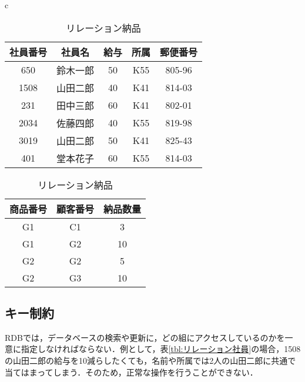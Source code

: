 \documentclass[a4paper,10pt]{jreport}
\begin{document}
\begin{table}[htp]
	\begin{center}
		\begin{tabular}{c}
			\begin{minipage}{0.5\hsize}
				\begin{center}
					\caption{リレーション社員}
					\label{tbl:リレーション社員}
					\begin{tabular}{|c|c|c|c|c|} \hline
						社員番号 & 社員名 & 給与 & 所属 & 郵便番号 \\ \hline \hline
						650  & 鈴木一郎 & 50 & K55 & 805-96 \\ \hline
						1508 & 山田二郎 & 40 & K41 & 814-03 \\ \hline
						231  & 田中三郎 & 60 & K41 & 802-01 \\ \hline
						2034 & 佐藤四郎 & 40 & K55 & 819-98 \\ \hline
						3019 & 山田二郎 & 50 & K41 & 825-43 \\ \hline
						401  & 堂本花子 & 60 & K55 & 814-03 \\ \hline
					\end{tabular}
				\end{center}
			\end{minipage}
			\begin{minipage}{0.5\hsize}
				\begin{center}
					\caption{リレーション納品}
					\label{tbl:リレーション納品}
					\begin{tabular}{|c|c|c|}\hline
						商品番号 & 顧客番号 & 納品数量 \\ \hline \hline
						G1 & C1 & 3  \\ \hline
						G1 & G2 & 10 \\ \hline
						G2 & G2 & 5  \\ \hline
						G2 & G3 & 10 \\ \hline
					\end{tabular}
				\end{center}
			\end{minipage}
		\end{tabular}
	\end{center}
\end{table}

\subsection{キー制約}
RDBでは，データベースの検索や更新に，どの組にアクセスしているのかを一意に指定しなければならない．例として，表\ref{tbl:リレーション社員}の場合，1508の山田二郎の給与を10減らしたくても，名前や所属では2人の山田二郎に共通で当てはまってしまう．そのため，正常な操作を行うことができない．
\end{document}
